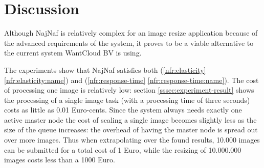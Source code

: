 \documentclass[10pt,journal,compsoc]{IEEEtran}
\def\namedref#1{\ref{#1} \ref{#1:name}}
\begin{document}
% 
% 
% 


\section{Discussion}
\label{sec:Discussion}
Although NajNaf is relatively complex for an image resize
application because of the advanced requirements of the system, it proves to be
a viable alternative to the current system WantCloud BV is using. 

The experiments show that
NajNaf satisfies both (\namedref{nfr:elasticity}) and
(\namedref{nfr:response-time}). The cost of processing one image is relatively
low: section
\ref{sssec:experiment-result} shows the processing of a single image task (with a
processing time of three seconds) costs as little as 0.01 Euro-cents. Since the
system always needs exactly one active master node the cost of scaling a single
image becomes slightly less as the size of the queue increases: the overhead of
having the master node is spread out over more images. Thus when extrapolating
over the found results, 10.000 images can
be submitted for a total cost of 1 Euro, while the resizing of 10.000.000 images
costs less than a 1000 Euro.
\end{document}
